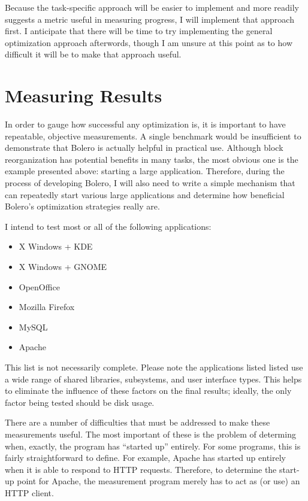 \documentclass[10pt,twocolumn]{article}
\begin{document}
Because the task-specific approach will be easier to implement and more readily
suggests a metric useful in measuring progress, I will implement that
approach first. I anticipate that there will be time to try implementing
the general optimization approach afterwords, though I am unsure at this point as to
how difficult it will be to make that approach useful.

\section{Measuring Results}

In order to gauge how successful any optimization is, it is important to have
repeatable, objective measurements. A single benchmark would be insufficient to demonstrate
that Bolero is actually helpful in practical use. Although block reorganization has
potential benefits in many tasks, the most obvious one is the example presented above:
starting a large application. Therefore, during the process of developing Bolero, I will
also need to write a simple mechanism that can repeatedly start various large applications
and determine how beneficial Bolero's optimization strategies really are.

I intend to test most or all of the following applications:
\begin{itemize}
\item X Windows + KDE
\item X Windows + GNOME
\item OpenOffice
\item Mozilla Firefox
\item MySQL
\item Apache
\end{itemize}
This list is not necessarily complete. Please note the applications listed
listed use a wide range of shared libraries, subsystems, and user interface types.
This helps to eliminate the influence of these factors on the final results;
ideally, the only factor being tested should be disk usage.

There are a number of difficulties that must be addressed to make these measurements useful.
The most important of these is the problem of determing when, exactly, the program has
``started up'' entirely. For some programs, this is fairly straightforward to define. For example,
Apache has started up entirely when it is able to respond to HTTP requests. Therefore,
to determine the start-up point for Apache, the measurement program merely has to act
as (or use) an HTTP client.
\end{document}
